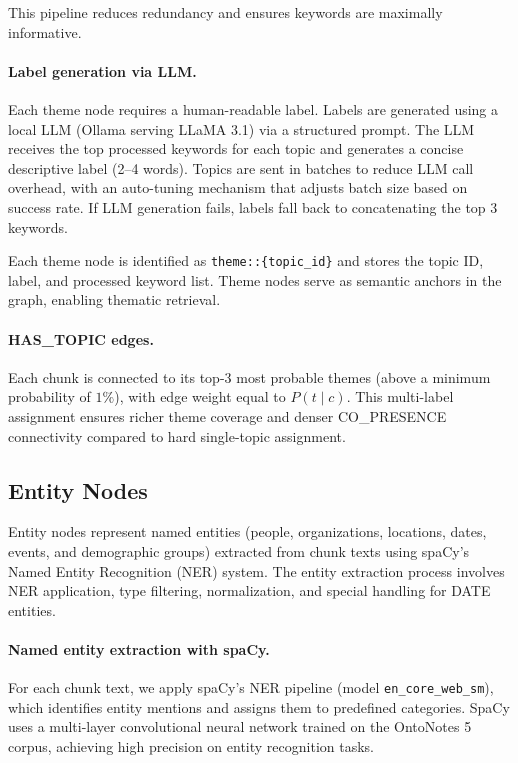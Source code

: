 \documentclass[10pt]{article}
\begin{document}
This pipeline reduces redundancy and ensures keywords are maximally informative.

\paragraph{Label generation via LLM.} Each theme node requires a human-readable label. Labels are generated using a local LLM (Ollama serving LLaMA 3.1) via a structured prompt. The LLM receives the top processed keywords for each topic and generates a concise descriptive label (2--4 words). Topics are sent in batches to reduce LLM call overhead, with an auto-tuning mechanism that adjusts batch size based on success rate. If LLM generation fails, labels fall back to concatenating the top 3 keywords.

Each theme node is identified as \texttt{theme::\{topic\_id\}} and stores the topic ID, label, and processed keyword list. Theme nodes serve as semantic anchors in the graph, enabling thematic retrieval.

\paragraph{HAS\_TOPIC edges.} Each chunk is connected to its top-3 most probable themes (above a minimum probability of $1\%$), with edge weight equal to $P(t \mid c)$. This multi-label assignment ensures richer theme coverage and denser CO\_PRESENCE connectivity compared to hard single-topic assignment.


\subsection{Entity Nodes}

Entity nodes represent named entities (people, organizations, locations, dates, events, and demographic groups) extracted from chunk texts using spaCy's Named Entity Recognition (NER) system. The entity extraction process involves NER application, type filtering, normalization, and special handling for DATE entities.

\paragraph{Named entity extraction with spaCy.} For each chunk text, we apply spaCy's NER pipeline (model \texttt{en\_core\_web\_sm}), which identifies entity mentions and assigns them to predefined categories. SpaCy uses a multi-layer convolutional neural network trained on the OntoNotes 5 corpus, achieving high precision on entity recognition tasks.
\end{document}
